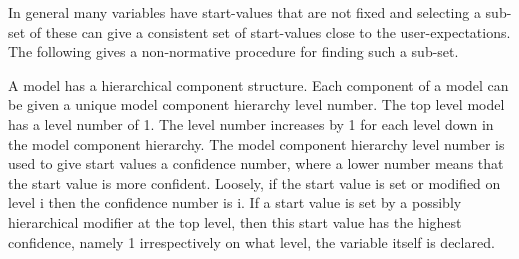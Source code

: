 In general many variables have start-values that are not fixed and
selecting a sub-set of these can give a consistent set of start-values
close to the user-expectations. The following gives a non-normative
procedure for finding such a sub-set.

\begin{nonnormative}
A model has a hierarchical component structure. Each component
of a model can be given a unique model component hierarchy level number.
The top level model has a level number of 1. The level number increases
by 1 for each level down in the model component hierarchy. The model
component hierarchy level number is used to give start values a
confidence number, where a lower number means that the start value is
more confident. Loosely, if the start value is set or modified on level
i then the confidence number is i. If a start value is set by a possibly
hierarchical modifier at the top level, then this start value has the
highest confidence, namely 1 irrespectively on what level, the variable
itself is declared.
\end{nonnormative}
